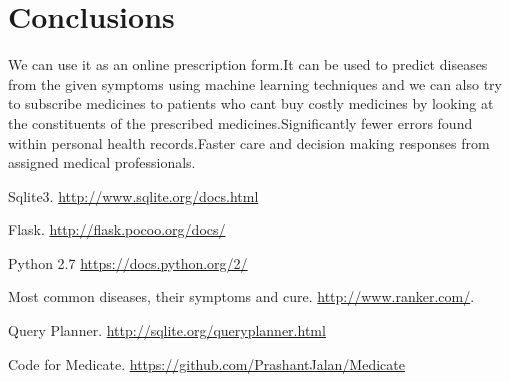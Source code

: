 \documentclass{article}
\begin{document}
\section{Conclusions}

We can use it as an online prescription form.It can be used to predict diseases from the given symptoms using machine learning techniques and we can also try to subscribe medicines to patients who cant buy costly medicines by looking at the constituents of the prescribed medicines.Significantly fewer errors found within personal health records.Faster care and decision making responses from assigned medical professionals.

\newpage
\begin{thebibliography}{9}


Sqlite3. \url{http://www.sqlite.org/docs.html}

Flask. \url{http://flask.pocoo.org/docs/}

Python 2.7 \url{https://docs.python.org/2/}

Most common diseases, their symptoms and cure. \url{http://www.ranker.com/}.

Query Planner. \url{http://sqlite.org/queryplanner.html}

Code for Medicate. \url{https://github.com/PrashantJalan/Medicate}

\end{thebibliography}
\end{document}
